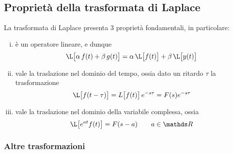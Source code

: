	\subsection{Proprietà della trasformata di Laplace}
		La trasformata di Laplace presenta 3 proprietà fondamentali, in particolare:
		\begin{enumerate}[i)]
			\item è un operatore lineare, e dunque
			\[ \L\big[\alpha \, f(t) + \beta\, g(t)\big]  = \alpha \, \L\big[f(t)\big] + \beta \, \L\big[y(t)\big] \]
			
			\item vale la traslazione nel dominio del tempo, ossia dato un ritardo $\tau$ la trasformazione
			\[ \L\big[f(t-\tau)\big] = L\big[f(t)\big]\, e^{-s\tau} = F(s) e^{-s\tau} \]
			
			\item vale la traslazione nel dominio della variabile complessa, ossia
			\[ \L\big[ e^{at} f(t) \big] = F(s-a) \qquad a\in \mathds R	\]
		
	\end{enumerate}
	
	\subsubsection{Altre trasformazioni}
	
